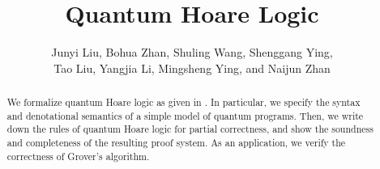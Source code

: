 \documentclass[11pt,a4paper]{article}
\begin{document}
\title{Quantum Hoare Logic}

\author{Junyi Liu, Bohua Zhan, Shuling Wang, Shenggang Ying,\\
  Tao Liu, Yangjia Li, Mingsheng Ying, and Naijun Zhan}

\maketitle

\begin{abstract}
  We formalize quantum Hoare logic as given in \cite{Ying12}. In
  particular, we specify the syntax and denotational semantics of a
  simple model of quantum programs. Then, we write down the rules of
  quantum Hoare logic for partial correctness, and show the soundness
  and completeness of the resulting proof system. As an application,
  we verify the correctness of Grover's algorithm.
\end{abstract}

\tableofcontents





\end{document}
